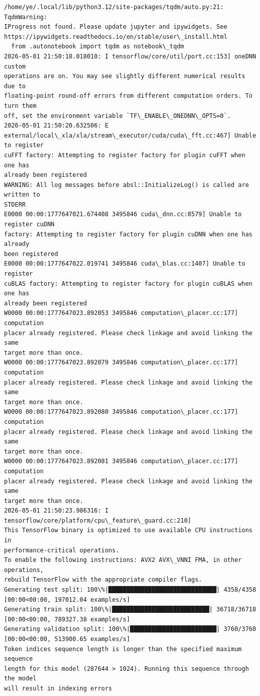 \documentclass[11pt]{article}
\begin{document}
    \begin{Verbatim}[commandchars=\\\{\}]
/home/ye/.local/lib/python3.12/site-packages/tqdm/auto.py:21: TqdmWarning:
IProgress not found. Please update jupyter and ipywidgets. See
https://ipywidgets.readthedocs.io/en/stable/user\_install.html
  from .autonotebook import tqdm as notebook\_tqdm
2026-05-01 21:50:18.018010: I tensorflow/core/util/port.cc:153] oneDNN custom
operations are on. You may see slightly different numerical results due to
floating-point round-off errors from different computation orders. To turn them
off, set the environment variable `TF\_ENABLE\_ONEDNN\_OPTS=0`.
2026-05-01 21:50:20.632506: E
external/local\_xla/xla/stream\_executor/cuda/cuda\_fft.cc:467] Unable to register
cuFFT factory: Attempting to register factory for plugin cuFFT when one has
already been registered
WARNING: All log messages before absl::InitializeLog() is called are written to
STDERR
E0000 00:00:1777647021.674408 3495846 cuda\_dnn.cc:8579] Unable to register cuDNN
factory: Attempting to register factory for plugin cuDNN when one has already
been registered
E0000 00:00:1777647022.019741 3495846 cuda\_blas.cc:1407] Unable to register
cuBLAS factory: Attempting to register factory for plugin cuBLAS when one has
already been registered
W0000 00:00:1777647023.892053 3495846 computation\_placer.cc:177] computation
placer already registered. Please check linkage and avoid linking the same
target more than once.
W0000 00:00:1777647023.892079 3495846 computation\_placer.cc:177] computation
placer already registered. Please check linkage and avoid linking the same
target more than once.
W0000 00:00:1777647023.892080 3495846 computation\_placer.cc:177] computation
placer already registered. Please check linkage and avoid linking the same
target more than once.
W0000 00:00:1777647023.892081 3495846 computation\_placer.cc:177] computation
placer already registered. Please check linkage and avoid linking the same
target more than once.
2026-05-01 21:50:23.986316: I tensorflow/core/platform/cpu\_feature\_guard.cc:210]
This TensorFlow binary is optimized to use available CPU instructions in
performance-critical operations.
To enable the following instructions: AVX2 AVX\_VNNI FMA, in other operations,
rebuild TensorFlow with the appropriate compiler flags.
Generating test split: 100\%|██████████████████████████████| 4358/4358
[00:00<00:00, 197012.04 examples/s]
Generating train split: 100\%|███████████████████████████| 36718/36718
[00:00<00:00, 789327.38 examples/s]
Generating validation split: 100\%|████████████████████████| 3760/3760
[00:00<00:00, 513900.65 examples/s]
Token indices sequence length is longer than the specified maximum sequence
length for this model (287644 > 1024). Running this sequence through the model
will result in indexing errors
    \end{Verbatim}
\end{document}
